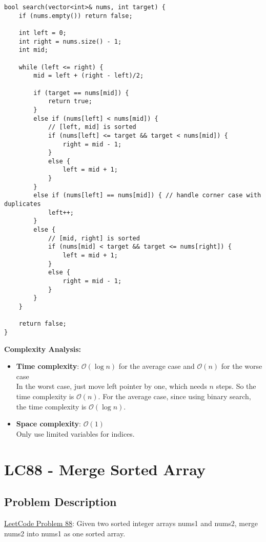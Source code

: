 \documentclass[justified]{tufte-book}
\begin{document}
\begin{lstlisting}
bool search(vector<int>& nums, int target) {
    if (nums.empty()) return false;
    
    int left = 0;
    int right = nums.size() - 1;
    int mid;
    
    while (left <= right) {
        mid = left + (right - left)/2;
        
        if (target == nums[mid]) {
            return true;
        }
        else if (nums[left] < nums[mid]) {
            // [left, mid] is sorted
            if (nums[left] <= target && target < nums[mid]) {
                right = mid - 1;
            }
            else {
                left = mid + 1;
            }
        }
        else if (nums[left] == nums[mid]) { // handle corner case with duplicates
            left++;
        }
        else {
            // [mid, right] is sorted
            if (nums[mid] < target && target <= nums[right]) {
                left = mid + 1;
            }
            else {
                right = mid - 1;
            }
        }
    }
    
    return false;
}
\end{lstlisting}
\noindent \textbf{Complexity Analysis:}
\begin{itemize}
    \item \textbf{Time complexity}: $\mathcal{O}(\log n)$ for the average case and  $\mathcal{O}(n)$ for the worse case\\
    In the worst case, just move left pointer by one, which needs $n$ steps. So the time complexity is $\mathcal{O}(n)$. For the average case, since using binary search, the time complexity is $\mathcal{O}(\log n)$.
    \item \textbf{Space complexity}: $\mathcal{O}(1)$ \\
    Only use limited variables for indices.
\end{itemize}

\section{LC88 - Merge Sorted Array} \label{sec:lc88_merge_sorted_array}
\subsection{Problem Description}
\href{https://leetcode.com/problems/merge-sorted-array/}{LeetCode Problem 88}: Given two sorted integer arrays nums1 and nums2, merge nums2 into nums1 as one sorted array.
\end{document}
